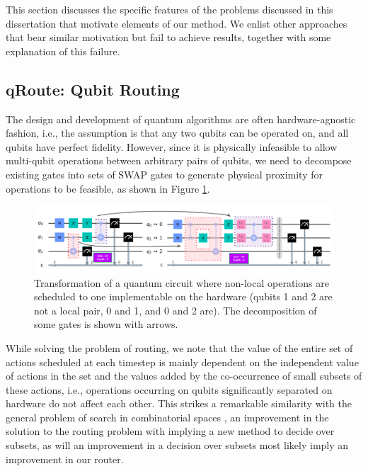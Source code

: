 This section discusses the specific features of the problems discussed in this dissertation that motivate elements of our method. We enlist other approaches that bear similar motivation but fail to achieve results, together with some explanation of this failure.

\subsection{qRoute: Qubit Routing}

The design and development of quantum algorithms are often hardware-agnostic fashion, i.e., the assumption is that any two qubits can be operated on, and all qubits have perfect fidelity. However, since it is physically infeasible to allow multi-qubit operations between arbitrary pairs of qubits, we need to decompose existing gates into sets of SWAP gates to generate physical proximity for operations to be feasible, as shown in Figure \ref{fig:intro-qubit-routing-example}. 

\begin{figure}[ht]
    \centering
    \includegraphics[width=\linewidth]{figures/intro/routing-transform.png}
    \caption[Example of the Qubit Routing task]{Transformation of a quantum circuit where non-local operations are scheduled to one implementable on the hardware (qubits 1 and 2 are not a local pair, 0 and 1, and 0 and 2 are). The decomposition of some gates is shown with arrows.}
    \label{fig:intro-qubit-routing-example}
\end{figure}

While solving the problem of routing, we note that the value of the entire set of actions scheduled at each timestep is mainly dependent on the independent value of actions in the set and the values added by the co-occurrence of small subsets of these actions, i.e., operations occurring on qubits significantly separated on hardware do not affect each other. This strikes a remarkable similarity with the general problem of search in combinatorial spaces \cite{qroute_dqn1}, an improvement in the solution to the routing problem with implying a new method to decide over subsets, as will an improvement in a decision over subsets most likely imply an improvement in our router.

